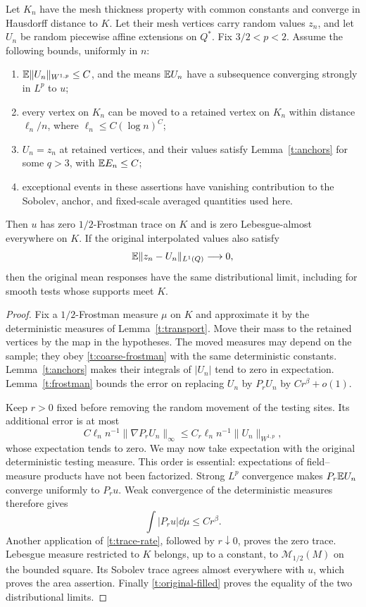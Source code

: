 \begin{proposition}
\label{t:varying-trace}
Let $K_n$ have the mesh thickness property with common constants and
converge in Hausdorff distance to $K$.  Let their mesh vertices carry
random values $z_n$, and let $U_n$ be random piecewise affine extensions
on $Q^*$.  Fix $3/2<p<2$.  Assume the following bounds, uniformly in $n$:
\begin{enumerate}
\item $\mathbb E\|U_n\|_{W^{1,p}}\le C$, and the means $\mathbb E U_n$ have a
      subsequence converging strongly in $L^p$ to $u$;
\item every vertex on $K_n$ can be moved to a retained vertex on $K_n$
      within distance $\ell_n/n$, where
      $\ell_n\le C(\log n)^C$;
\item $U_n=z_n$ at retained vertices, and their values satisfy
      Lemma~\ref{t:anchors} for some $q>3$, with $\mathbb E E_n\le C$;
\item exceptional events in these assertions have vanishing contribution
      to the Sobolev, anchor, and fixed-scale averaged quantities used
      here.
\end{enumerate}
Then $u$ has zero $1/2$-Frostman trace on $K$ and is zero Lebesgue-almost
everywhere on $K$.  If the original interpolated values also satisfy
\begin{equation}\label{t:original-filled}
 \mathbb E\|z_n-U_n\|_{L^1(Q)}\longrightarrow0,
\end{equation}
then the original mean responses have the same distributional limit,
including for smooth tests whose supports meet $K$.
\end{proposition}
\begin{proof}
Fix a $1/2$-Frostman measure $\mu$ on $K$ and approximate it by the
deterministic measures of Lemma~\ref{t:transport}.  Move their mass to the
retained vertices by the map in the hypotheses.  The moved measures may
depend on the sample; they obey \eqref{t:coarse-frostman} with the same
deterministic constants.  Lemma~\ref{t:anchors} makes their integrals of
$|U_n|$ tend to zero in expectation.  Lemma~\ref{t:frostman} bounds the
error on replacing $U_n$ by $P_rU_n$ by $Cr^\beta+o(1)$.

Keep $r>0$ fixed before removing the random movement of the testing sites.
Its additional error is at most
\[
 C\ell_n n^{-1}\|\nabla P_rU_n\|_\infty
 \le C_r\ell_n n^{-1}\|U_n\|_{W^{1,p}},
\]
whose expectation tends to zero.  We may now take expectation with the
original deterministic testing measure.  This order is essential:
expectations of field--measure products have not been factorized.
Strong $L^p$ convergence makes $P_r\mathbb E U_n$ converge uniformly to $P_ru$.
Weak convergence of the deterministic measures therefore gives
\[
 \int|P_ru|\dd\mu\le Cr^\beta.
\]
Another application of \eqref{t:trace-rate}, followed by $r\downarrow0$,
proves the zero trace.  Lebesgue measure restricted to $K$ belongs, up to
a constant, to $\mathcal M_{1/2}(M)$ on the bounded square.  Its Sobolev
trace agrees almost everywhere with $u$, which proves the area assertion.
Finally \eqref{t:original-filled} proves the equality of the two
distributional limits.
\end{proof}

